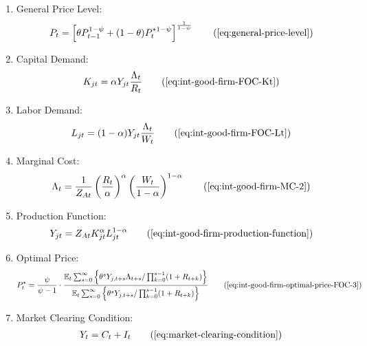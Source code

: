 \documentclass[
	thesis.tex
	]{subfiles}
\begin{document}
{\begin{itemize}
\begin{enumerate}
			\item General Price Level:
			\begin{align}
				P_t = \left[ \theta P_{t-1}^{1-\psi} + (1-\theta) P_t^{\ast 1-\psi} \right]^\frac{1}{1-\psi}
				\tag{\ref{eq:general-price-level}}
			\end{align}
			
			\item Capital Demand:
			\begin{align}
				K_{jt} = \alpha Y_{jt} \frac{\Lambda_t}{R_t}
				\tag{\ref{eq:int-good-firm-FOC-Kt}}
			\end{align}
			
			\item Labor Demand:
			\begin{align}
				L_{jt} = (1-\alpha) Y_{jt} \frac{\Lambda_t}{W_t}
				\tag{\ref{eq:int-good-firm-FOC-Lt}}
			\end{align}
			
			
			\item Marginal Cost:
			\begin{align}
				\Lambda_t = \frac{1}{Z_{At}} \left( \frac{R_t}{\alpha} \right)^{\alpha} \left( \frac{W_t}{1-\alpha} \right)^{1-\alpha}
				\tag{\ref{eq:int-good-firm-MC-2}}
			\end{align}
			
			\item Production Function:
			\begin{align}
				Y_{jt} = Z_{At} K_{jt}^\alpha L_{jt}^{1-\alpha}
				\tag{\ref{eq:int-good-firm-production-function}}
			\end{align}
			
			\item Optimal Price:
			\begin{align}
				P_t^\ast = \frac{\psi}{\psi-1} \cdot \frac{ \E \sum_{s=0}^{\infty} \left\{ \theta^s Y_{j,t+s} \Lambda_{t+s} / \prod_{k=0}^{s-1}(1+R_{t+k}) \right\} } {\E \sum_{s=0}^{\infty} \left\{ \theta^s Y_{j,t+s} / \prod_{k=0}^{s-1}(1 + R_{t+k}) \right\}} \tag{\ref{eq:int-good-firm-optimal-price-FOC-3}}
			\end{align}
			
			\item Market Clearing Condition:
			\begin{align}
				Y_t = C_t + I_t
				\tag{\ref{eq:market-clearing-condition}}
			\end{align}
			

\end{enumerate}
\end{itemize}}
\end{document}
